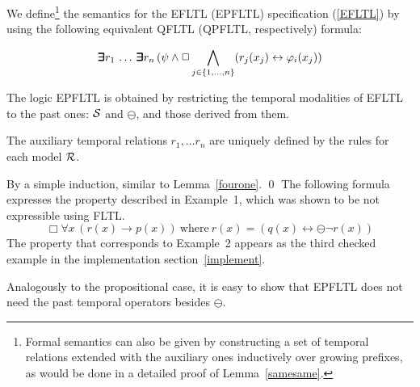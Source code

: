 \noindent
We define\footnote{ Formal semantics 
can also be given by constructing a set of temporal relations extended
with the auxiliary ones
inductively over growing prefixes, as would be done in a detailed proof of Lemma~\ref{samesame}.} the semantics for the EFLTL (EPFLTL)
specification (\ref{EFLTL}) 
by using the following equivalent
QFLTL (QPFLTL, respectively) formula:

\begin{equation} \label{equiv}
\bm{\exists}\kern-0.6em\bm{\exists} r_1  \, \ldots \, \bm{\exists}\kern-0.6em\bm{\exists} r_n \,  ( \psi \wedge \Box \bigwedge_{j \in \{ 1, \ldots , n\}} (r_j ( x_j )  \leftrightarrow 
\varphi_i ( x_j) )
\end{equation}

The logic EPFLTL is obtained by restricting the temporal modalities of EFLTL to the past ones:
${\cal S}$ and $\ominus$, and those derived from them.

\begin{lemma} \label{samesame}
The auxiliary temporal relations $r_1, \ldots r_n$ are
uniquely defined by the rules for each model ${\cal R}$.
\end{lemma}
 By a simple induction, similar to Lemma~\ref{fourone}. \qed
\vspace{1ex}
The following formula expresses the property described in Example~1, which was shown to be 
not expressible using FLTL.
\begin{equation}
\Box \forall x \, (r(x)\rightarrow p(x)) \mathrm{\ where\ }
r(x) = ( q(x) \leftrightarrow \ominus \neg  r(x)) 
\label{eq:wolper-first-order}
\end{equation}
The property that corresponds to Example~2 appears as the third checked example in the implementation section~\ref{implement}.




Analogously to the propositional case, it is easy to show that EPFLTL does not
need the past temporal operators besides $\ominus$.





